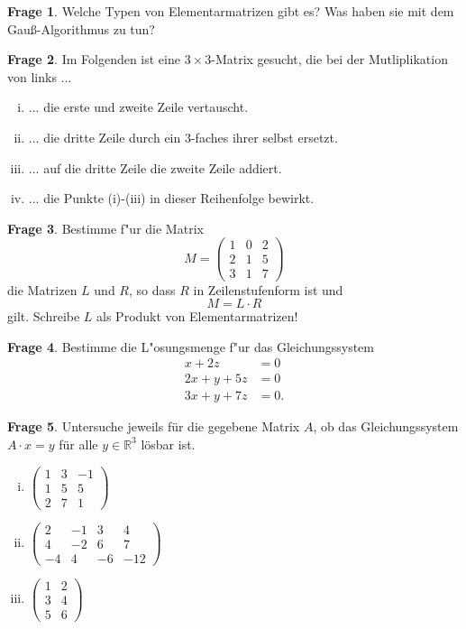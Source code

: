 \documentclass{scrartcl}
\theoremstyle{definition}
\newtheorem{frage}{Frage}[section]
\newcommand{\R}{\mathbb R}
\begin{document}
\begin{frage}
Welche Typen von Elementarmatrizen gibt es? Was haben sie mit dem
Gauß-Algorithmus zu tun?
\end{frage}

\begin{frage}
Im Folgenden ist eine $3\times3$-Matrix gesucht, die bei der
Mutliplikation von links ...
\begin{enumerate}[(i)]
\item ... die erste und zweite Zeile vertauscht.
\item ... die dritte Zeile durch ein 3-faches ihrer selbst ersetzt.
\item ... auf die dritte Zeile die zweite Zeile addiert.
\item ... die Punkte (i)-(iii) in dieser Reihenfolge bewirkt.
\end{enumerate}
\end{frage}

\begin{frage}
Bestimme f"ur die Matrix
\[ M =
\begin{pmatrix}
  1  & 0 & 2 \\
  2  & 1 & 5 \\
  3  & 1 & 7
\end{pmatrix}
\] die Matrizen $L$ und $R$, so dass $R$ in Zeilenstufenform ist und
\[ M = L \cdot R \]
gilt. Schreibe $L$ als Produkt von Elementarmatrizen!
\end{frage}

\begin{frage}
Bestimme die L"osungsmenge f"ur das Gleichungssystem
\begin{align*}
x + 2 z &= 0\\
2x + y + 5z &= 0\\
3x + y + 7z &= 0.
\end{align*}
\end{frage}

\begin{frage}
Untersuche jeweils für die gegebene Matrix $A$, ob das Gleichungssystem
$A \cdot x = y$ für alle $y \in \R^3$ lösbar ist.
\begin{multicols}{3}
\begin{enumerate}[(i)]
\item $\begin{pmatrix} 1 & 3 & -1 \\ 1 & 5 & 5 \\ 2 & 7 & 1 \end{pmatrix}$
\item $\begin{pmatrix} 2 & -1 & 3 & 4 \\ 4 & -2 & 6 & 7 \\ -4 & 4 & -6 & -12 \end{pmatrix}$
\item $\begin{pmatrix} 1 & 2 \\ 3 & 4 \\ 5 & 6 \end{pmatrix}$
\end{enumerate}
\end{multicols}
\end{frage}
\end{document}
